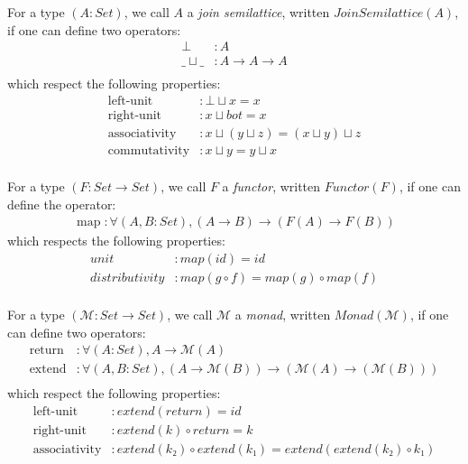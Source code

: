 \documentclass{article}
\begin{document}
\begin{definition}
For a type $(A : Set)$, we call $A$ a \emph{join semilattice}, written $JoinSemilattice(A)$, if one can define two operators:
\begin{align*}
    ⊥ &: A         \\
\_⊔\_ &: A → A → A \\
\end{align*}
which respect the following properties:
\begin{align*}
    \operatorname{left-unit} &: ⊥ ⊔ x = x                  \\
   \operatorname{right-unit} &: x ⊔ bot = x                \\
\operatorname{associativity} &: x ⊔ (y ⊔ z) = (x ⊔ y) ⊔ z  \\
\operatorname{commutativity} &: x ⊔ y = y ⊔ x              \\
\end{align*}
\end{definition}

\begin{definition}
For a type $(F : Set → Set)$, we call $F$ a \emph{functor}, written $Functor(F)$, if one can define the operator:
\begin{align*}
\operatorname{map} : ∀ (A , B : Set), (A → B) → (F(A) → F(B))
\end{align*}
which respects the following properties:
\begin{align*}
          unit &: map(id) = id                  \\
distributivity &: map(g ∘ f) = map(g) ∘ map(f)  \\
\end{align*}
\end{definition}

\begin{definition}
For a type $(ℳ  : Set → Set)$, we call $ℳ $ a \emph{monad}, written $Monad(ℳ )$, if one can define two operators:
\begin{align*}
\operatorname{return} &: ∀ (A : Set), A → ℳ (A)                          \\
\operatorname{extend} &: ∀ (A, B : Set), (A → ℳ (B)) → (ℳ (A) → (ℳ (B))) \\
\end{align*}
which respect the following properties:
\begin{align*}
    \operatorname{left-unit} &: extend(return) = id                               \\
   \operatorname{right-unit} &: extend(k) ∘ return = k                            \\
\operatorname{associativity} &: extend(k₂) ∘ extend(k₁) = extend(extend(k₂) ∘ k₁) \\
\end{align*}
\end{definition}
\end{document}
